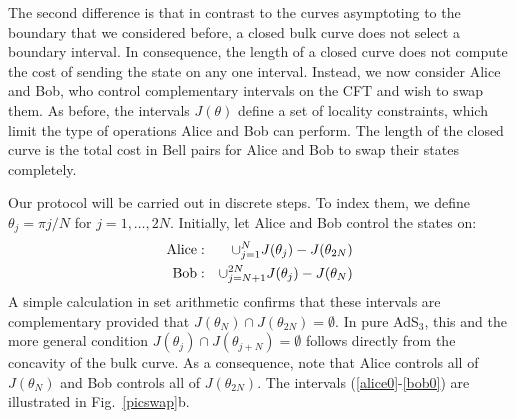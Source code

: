 \documentclass[12pt]{article}
\begin{document}
The second difference is that in contrast to the curves asymptoting to the boundary that we considered before, a closed bulk curve does not select a boundary interval. In consequence, the length of a closed curve does not compute the cost of sending the state on any one interval. Instead, we now consider Alice and Bob, who control complementary intervals on the CFT and wish to swap them. As before, the intervals $J(\theta)$ define a set of locality constraints, which limit the type of operations Alice and Bob can perform. The length of the closed curve is the total cost in Bell pairs for Alice and Bob to swap their states completely.

Our protocol will be carried out in discrete steps. To index them, we define $\theta_j = \pi j / N$ for $j = 1, \ldots, 2N$. Initially, let Alice and Bob control the states on:
\begin{eqnarray}
{\rm Alice:} & & \cup_{j = 1}^N J(\theta_j) - J(\theta_{2N}) \label{alice0} \\
{\rm Bob:} & & \cup_{j = N+1}^{2N} J(\theta_j) - J(\theta_{N}) \label{bob0}
\end{eqnarray}
A simple calculation in set arithmetic confirms that these intervals are complementary provided that $J(\theta_N) \cap J(\theta_{2N}) = \emptyset$. In pure AdS$_3$, this and the more general condition $J(\theta_j) \cap J(\theta_{j+N}) = \emptyset$ follows directly from the concavity of the bulk curve. As a consequence, note that Alice controls all of $J(\theta_N)$ and Bob controls all of $J(\theta_{2N})$. The intervals (\ref{alice0}-\ref{bob0}) are illustrated in Fig.~\ref{picswap}b.
\end{document}
